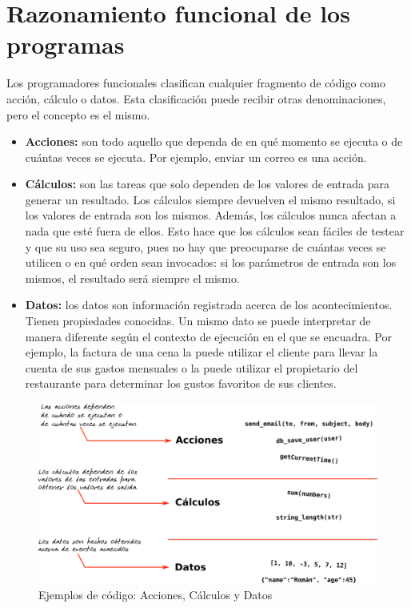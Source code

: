 \documentclass[a4paper,11pt]{extarticle}
\begin{document}
\section{Razonamiento funcional de los programas}
Los programadores funcionales clasifican cualquier fragmento de código como acción, cálculo o datos. Esta clasificación puede recibir otras denominaciones, pero el concepto es el mismo. 

\begin{itemize}
	\item \textbf{Acciones:} son todo aquello que dependa de en qué momento se ejecuta o de cuántas veces se ejecuta. Por ejemplo, enviar un correo es una acción.
	\item \textbf{Cálculos:} son las tareas que solo dependen de los valores de entrada para generar un resultado. Los cálculos siempre devuelven el mismo resultado, si los valores de entrada son los mismos. Además, los cálculos nunca afectan a nada que esté fuera de ellos. Esto hace que los cálculos sean fáciles de testear y que su uso sea seguro, pues no hay que preocuparse de cuántas veces se utilicen o en qué orden sean invocados: si los parámetros de entrada son los mismos, el resultado será siempre el mismo.
	\item \textbf{Datos:} los datos son información registrada acerca de los acontecimientos. Tienen propiedades conocidas. Un mismo dato se puede interpretar de manera diferente según el contexto de ejecución en el que se encuadra. Por ejemplo, la factura de una cena la puede utilizar el cliente para llevar la cuenta de sus gastos mensuales o la puede utilizar el propietario del restaurante para determinar los gustos favoritos de sus clientes.
\end{itemize}

\begin{figure}[htb]
	\centering
	\includegraphics[width=0.9\linewidth]{img/AccCalcData.png}
	\caption{Ejemplos de código: Acciones, Cálculos y Datos}
	\label{fig_acccalcdata}
\end{figure}
\end{document}
